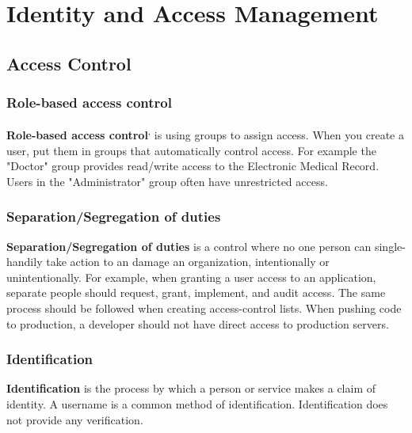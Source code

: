 \section{Identity and Access Management}\label{sec:"Identity and Access Management"}
\subsection{Access Control}
\subsubsection{Role-based access control}\textbf{Role-based access control}\textsuperscript{,} is using groups to assign access. When you create a user, put them in groups that automatically control access. For example the "Doctor" group provides read/write access to the Electronic Medical Record. Users in the "Administrator" group often have unrestricted access.
\subsubsection{Separation/Segregation of duties}\textbf{Separation/Segregation of duties} is a control where no one person can single-handily take action to an damage an organization, intentionally or unintentionally.  For example, when granting a user access to an application, separate people should request, grant, implement, and audit access. The same process should be followed when creating access-control lists. When pushing code to production, a developer should not have direct access to production servers. 
\subsubsection{Identification}\textbf{Identification} is the process by which a person or service makes a claim of identity. A username is a common method of identification. Identification does not provide any verification.
